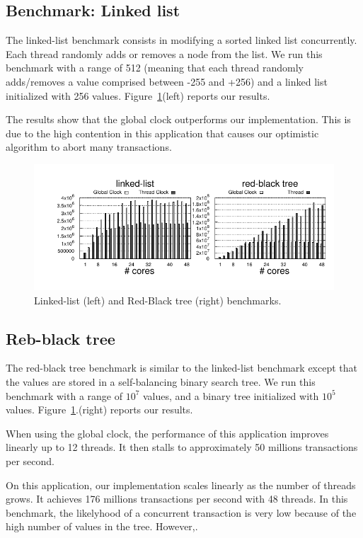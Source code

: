 \subsection{Benchmark: Linked list}

The linked-list benchmark consists in modifying a sorted linked list concurrently. 
Each thread randomly adds or removes a node from the list. 
We run this benchmark with a range of 512 (meaning that each thread randomly adds/removes a value comprised between -255 and +256) and a linked list initialized with 256 values.
Figure~\ref{fig:benchmarking:llrb}(left) reports our results.

The results show that the global clock outperforms our implementation. 
This is due to the high contention in this application that causes our optimistic algorithm to abort  many transactions.

\begin{figure}[!t]
	\centering
	\includegraphics[scale = 1.0]{results/intset/ll-rb.pdf}
	\caption{Linked-list (left) and Red-Black tree (right) benchmarks.\label{fig:benchmarking:llrb}}
\end{figure}

\subsection{Reb-black tree}

The red-black tree benchmark is similar to the linked-list benchmark except that the values are stored in a self-balancing binary search tree. 
We run this benchmark with a range of $10^7$ values, and a binary tree initialized with $10^5$ values.
Figure~\ref{fig:benchmarking:llrb}.(right) reports our results.

When using the global clock, the performance of this application improves linearly up to 12 threads. 
It then stalls to approximately 50 millions transactions per second.

On this application, our implementation scales linearly as the number of threads grows. 
It achieves 176 millions transactions per second with 48 threads.
%
In this benchmark, the likelyhood of a concurrent transaction is very low because of the high number of values in the tree. However,.
%
